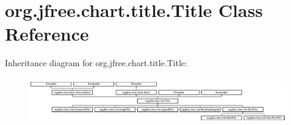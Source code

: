 \hypertarget{classorg_1_1jfree_1_1chart_1_1title_1_1_title}{}\section{org.\+jfree.\+chart.\+title.\+Title Class Reference}
\label{classorg_1_1jfree_1_1chart_1_1title_1_1_title}
Inheritance diagram for org.\+jfree.\+chart.\+title.\+Title\+:\begin{figure}[H]
\begin{center}
\leavevmode
\includegraphics[height=2.020202cm]{classorg_1_1jfree_1_1chart_1_1title_1_1_title}
\end{center}
\end{figure}
